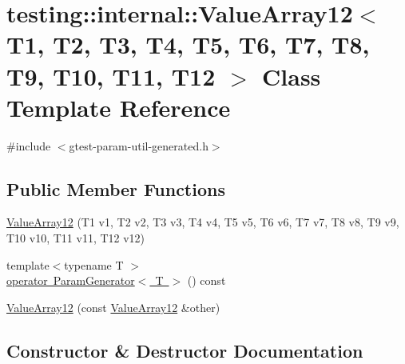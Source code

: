 \hypertarget{classtesting_1_1internal_1_1ValueArray12}{}\section{testing\+::internal\+::Value\+Array12$<$ T1, T2, T3, T4, T5, T6, T7, T8, T9, T10, T11, T12 $>$ Class Template Reference}
\label{classtesting_1_1internal_1_1ValueArray12}


{\ttfamily \#include $<$gtest-\/param-\/util-\/generated.\+h$>$}

\subsection*{Public Member Functions}
\begin{DoxyCompactItemize}
\item 
\mbox{\hyperlink{classtesting_1_1internal_1_1ValueArray12_aaebe12df41b8122fd03f5d6aa1c820a7}{Value\+Array12}} (T1 v1, T2 v2, T3 v3, T4 v4, T5 v5, T6 v6, T7 v7, T8 v8, T9 v9, T10 v10, T11 v11, T12 v12)
\item 
{\footnotesize template$<$typename T $>$ }\\\mbox{\hyperlink{classtesting_1_1internal_1_1ValueArray12_acc840a1c32a10ce160731d66c8105e0b}{operator Param\+Generator$<$ T $>$}} () const
\item 
\mbox{\hyperlink{classtesting_1_1internal_1_1ValueArray12_a901c95791c3b16ca51fcd7fc1323fef2}{Value\+Array12}} (const \mbox{\hyperlink{classtesting_1_1internal_1_1ValueArray12}{Value\+Array12}} \&other)
\end{DoxyCompactItemize}


\subsection{Constructor \& Destructor Documentation}
\mbox{\label{classtesting_1_1internal_1_1ValueArray12_aaebe12df41b8122fd03f5d6aa1c820a7}} 
